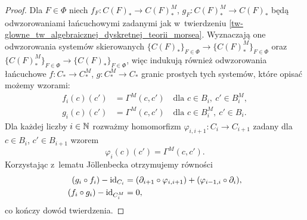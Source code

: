 \begin{proof}
Dla $F\in\Phi$ niech $f_F\colon C(F)_*\to C(F)_*^M$, $g_F\colon C(F)_*^M\to C(F)_*$ będą odwzorowaniami łańcuchowymi zadanymi jak w~twierdzeniu \ref{tw-glowne_tw_algebraicznej_dyskretnej_teorii_morsea}. Wyznaczają one odwzorowania systemów skierowanych $\{C(F)_*\}_{F\in\Phi}\to \{C(F)^M_*\}_{F\in\Phi}$ oraz $\{C(F)_*^M\}_{F\in\Phi}\to \{C(F)_*\}_{F\in\Phi}$, więc indukują również odwzorowania łańcuchowe $f\colon C_*\to C_*^M$, $g\colon C_*^M\to C_*$ granic prostych tych systemów, które opisać możemy wzorami:
\begin{align*}
f_i(c)(c')&=\Gamma^M(c,c')\quad \text{dla } c\in B_i,\ c'\in B_i^M,\\
g_i(c)(c')&=\Gamma^M(c,c')\quad \text{dla } c\in B^M_i,\ c'\in B_i.
\end{align*}
Dla każdej liczby $i\in \mathbb{N}$ rozważmy homomorfizm $\varphi_{i,i+1}\colon C_i\to C_{i+1}$ zadany dla $c\in B_i$, $c'\in B_{i+1}$ wzorem \[\varphi_i(c)(c')=\Gamma^M(c,c').\] 
Korzystając z~lematu J{\"o}llenbecka \cite[Lemma 2.3]{Jollenbeck05} otrzymujemy równości
\begin{align*}(g_i\circ f_i) - \operatorname{id}_{C_i}&=(\partial_{i+1} \circ \varphi_{i,i+1})+(\varphi_{i-1,i}\circ \partial_i),\\(f_i\circ g_i) - \operatorname{id}_{C_i^M}&= 0,\end{align*} co kończy dowód twierdzenia.
\end{proof}

